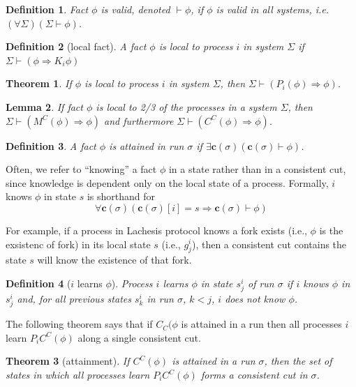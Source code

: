 \documentclass{article}
\newtheorem{thm}{Theorem}[section]
\newtheorem{lem}[thm]{Lemma}
\newtheorem{defn}{Definition}[section]
\renewcommand{\vec}[1]{\mathbf{#1}}
\begin{document}
\begin{defn}
	Fact $\phi$ is valid, denoted $\vdash \phi$, if $\phi$ is valid in all systems, i.e. 
	$(\forall \Sigma) (\Sigma \vdash \phi)$.
\end{defn}

\begin{defn}[local fact]
	 A fact $\phi$ is local to process $i$ in system $\Sigma$ if
	 $\Sigma \vdash (\phi \Rightarrow K_i \phi)$
\end{defn}

\begin{thm} If $\phi$ is local to process $i$ in system $\Sigma$, then $\Sigma \vdash (P_i(\phi) \Rightarrow \phi)$.	
\end{thm}

\begin{lem}
	If fact $\phi$ is local to 2/3 of the processes in a system $\Sigma$, then $\Sigma \vdash (M^C(\phi) \Rightarrow \phi)$ and furthermore $\Sigma \vdash (C^C(\phi) \Rightarrow \phi)$.
	\end{lem}



\begin{defn}
	A fact $\phi$ is attained in run $\sigma$ if $\exists \vec{c}(\sigma) (\vec{c}(\sigma) \vdash \phi)$.
\end{defn}

Often, we refer to ``knowing'' a fact $\phi$ in a state rather than in a consistent cut, since knowledge is dependent only on the local state of a process.
Formally, $i$ knows $\phi$ in state $s$ is shorthand for
$$\forall \vec{c}(\sigma) (\vec{c}(\sigma)[i] = s \Rightarrow \vec{c}(\sigma) \vdash \phi)$$

For example, if a process in Lachesis protocol knows a fork exists (i.e., $\phi$ is the exsistenc of fork) in its local state $s$ (i.e., $g_j^i$), then a consistent cut contains the state $s$ will know the existence of that fork.

\begin{defn}[$i$ learns $\phi$]
 Process $i$ learns $\phi$ in state $s_j^i$ of run $\sigma$ if $i$ knows $\phi$ in $s_j^i$ and, for all previous states $s_k^i$ in run $\sigma$, $k < j$, $i$ does not know $\phi$.
 \end{defn}

The following theorem says that if $C_C(\phi$ is attained in a run then all processes $i$ learn $P_i C^C(\phi)$ along a single consistent cut.

\begin{thm}[attainment]
	 If $C^C(\phi)$ is attained in a run $\sigma$, then the set of states in which all processes learn $P_i C^C(\phi)$ forms a consistent cut in $\sigma$.	
\end{thm}
\end{document}
